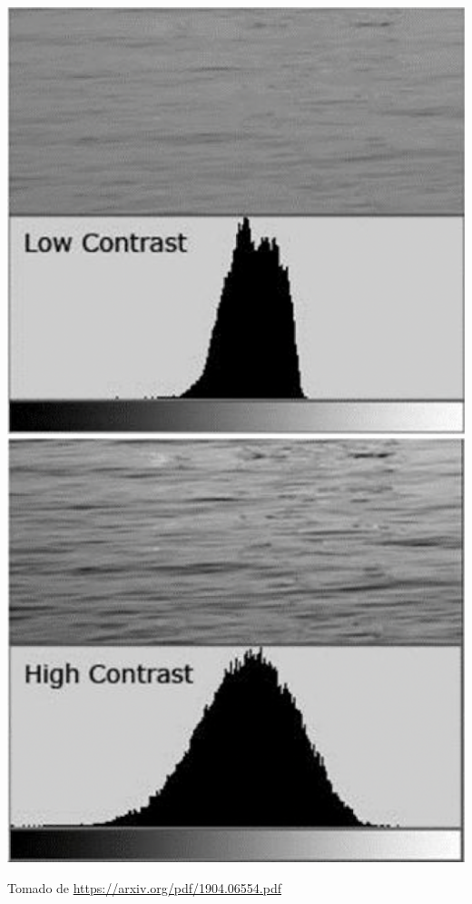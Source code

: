 \documentclass[
10pt, %
aspectratio=169, %
]{beamer}
\begin{document}
\begin{frame}
		\centering
		\includegraphics[scale=0.2]{textura1.png} 
		\pause
		\includegraphics[scale=0.2]{textura2.png} 		
		
		{\scriptsize Tomado de \url{https://arxiv.org/pdf/1904.06554.pdf}}
		
	\end{frame}
	
\end{document}
